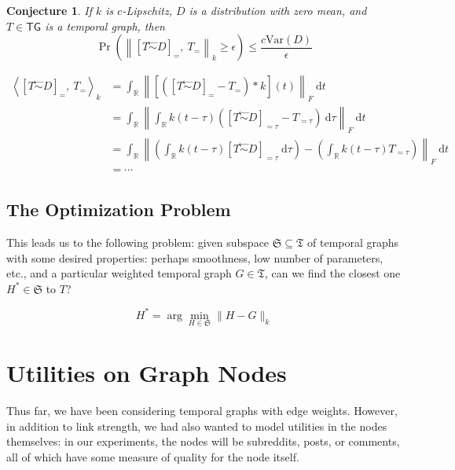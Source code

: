 \documentclass{article}
\newtheorem{conj}{Conjecture}
\theoremstyle{definition}
\newcommand{\noised}[2]{\left[#1 \stackrel{\gets}{\sim } #2\right]}
\begin{document}
	\begin{conj}
		If $k$ is $c$-Lipschitz, $D$ is a distribution with zero mean, and $T \in \mathsf{TG}$ is a temporal graph, then 
		\[ \Pr \left(\left\lVert \noised T {D} _=,~T_= \right\rVert_k \geq \epsilon \right)\leq \frac{c \mathrm{Var}(D)}{\epsilon} \]
	\end{conj}
	\begin{center}
		\begin{align*}
			\left\langle \noised T {D} _=,~T_= \right\rangle_k
				 &= \int_{\mathbb R} \left\lVert \left[\left( \noised T {D} _= - T_=\right) * k\right] (t) \right \rVert_F ~\mathrm d t \\
				 &= \int_{\mathbb R} \left\lVert \int_{\mathbb R} k(t - \tau)\left( \noised T {D} _{=\tau} - T_{=\tau}\right)~\mathrm d \tau \right \rVert_F ~\mathrm d t\\
				 &= \int_{\mathbb R} \left\lVert \left(\int_{\mathbb R} k(t - \tau) \noised T {D} _{=\tau} ~\mathrm d \tau\right) - 
				 \left( \int_{\mathbb R} k(t - \tau)  T_{=\tau}\right) \right \rVert_F ~\mathrm d t\\
				 &= \cdots
		\end{align*}
	\end{center}
	
	\subsection{The Optimization Problem}
	
	This leads us to the following problem: given subspace $\mathfrak S \subseteq \mathfrak T$ of temporal graphs with some desired properties: perhaps smoothness, low number of parameters, etc., and a particular weighted temporal graph $G \in \mathfrak T$, can we find the closest one $H^* \in \mathfrak S$ to $T$?
	
	\[ H^* = \arg\min_{H \in \mathfrak S} \Big\lVert H  - G \Big\rVert_k \]
	
	
	\section{Utilities on Graph Nodes}
	Thus far, we have been considering temporal graphs with edge weights. However, in addition to link strength, we had also wanted to model utilities in the nodes themselves: in our experiments, the nodes will be subreddits, posts, or comments, all of which have some measure of quality for the node itself.
	
	
\end{document}
